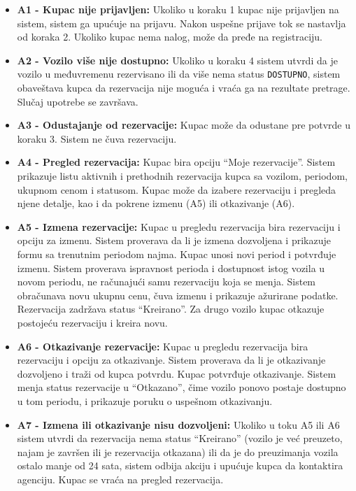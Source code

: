 \documentclass[a4paper,12pt]{article}
\begin{document}
\begin{itemize}
    \item \textbf{A1 - Kupac nije prijavljen:}
    Ukoliko u koraku 1 kupac nije prijavljen na sistem, sistem ga upućuje na prijavu. Nakon uspešne prijave tok se nastavlja od koraka 2. Ukoliko kupac nema nalog, može da pređe na registraciju.

    \item \textbf{A2 - Vozilo više nije dostupno:}
    Ukoliko u koraku 4 sistem utvrdi da je vozilo u međuvremenu rezervisano ili da više nema status \texttt{DOSTUPNO}, sistem obaveštava kupca da rezervacija nije moguća i vraća ga na rezultate pretrage. Slučaj upotrebe se završava.

    \item \textbf{A3 - Odustajanje od rezervacije:}
    Kupac može da odustane pre potvrde u koraku 3. Sistem ne čuva rezervaciju.

    \item \textbf{A4 - Pregled rezervacija:}
    Kupac bira opciju \enquote{Moje rezervacije}. Sistem prikazuje listu aktivnih i prethodnih rezervacija kupca sa vozilom, periodom, ukupnom cenom i statusom. Kupac može da izabere rezervaciju i pregleda njene detalje, kao i da pokrene izmenu (A5) ili otkazivanje (A6).

    \item \textbf{A5 - Izmena rezervacije:}
    Kupac u pregledu rezervacija bira rezervaciju i opciju za izmenu. Sistem proverava da li je izmena dozvoljena i prikazuje formu sa trenutnim periodom najma. Kupac unosi novi period i potvrđuje izmenu. Sistem proverava ispravnost perioda i dostupnost istog vozila u novom periodu, ne računajući samu rezervaciju koja se menja. Sistem obračunava novu ukupnu cenu, čuva izmenu i prikazuje ažurirane podatke. Rezervacija zadržava status \enquote{Kreirano}. Za drugo vozilo kupac otkazuje postojeću rezervaciju i kreira novu.

    \item \textbf{A6 - Otkazivanje rezervacije:}
    Kupac u pregledu rezervacija bira rezervaciju i opciju za otkazivanje. Sistem proverava da li je otkazivanje dozvoljeno i traži od kupca potvrdu. Kupac potvrđuje otkazivanje. Sistem menja status rezervacije u \enquote{Otkazano}, čime vozilo ponovo postaje dostupno u tom periodu, i prikazuje poruku o uspešnom otkazivanju.

    \item \textbf{A7 - Izmena ili otkazivanje nisu dozvoljeni:}
    Ukoliko u toku A5 ili A6 sistem utvrdi da rezervacija nema status \enquote{Kreirano} (vozilo je već preuzeto, najam je završen ili je rezervacija otkazana) ili da je do preuzimanja vozila ostalo manje od 24 sata, sistem odbija akciju i upućuje kupca da kontaktira agenciju. Kupac se vraća na pregled rezervacija.


\end{itemize}
\end{document}
